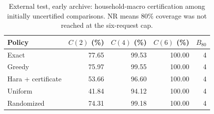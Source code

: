 \documentclass[12pt]{article}
\begin{document}
\begin{table}[htbp]
\centering\small
\caption{External test, early archive: household-macro certification among initially uncertified comparisons. NR means 80\% coverage was not reached at the six-request cap.}
\label{tab:external-stopping}
\begin{tabular}{lrrrr}
\toprule
Policy & $C(2)$ (\%) & $C(4)$ (\%) & $C(6)$ (\%) & $B_{80}$\\
\midrule
Exact & 77.65 & 99.53 & 100.00 & 4\\
Greedy & 75.97 & 99.55 & 100.00 & 4\\
Hara + certificate & 53.66 & 96.60 & 100.00 & 4\\
Uniform & 41.84 & 94.12 & 100.00 & 4\\
Randomized & 74.31 & 99.18 & 100.00 & 4\\
\bottomrule
\end{tabular}
\end{table}
\end{document}
